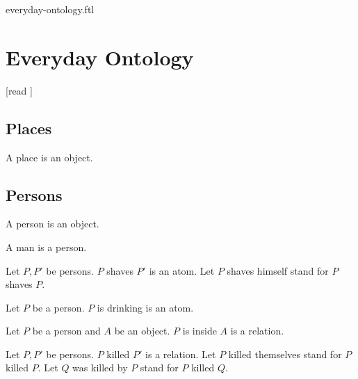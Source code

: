 \documentclass{article}
\begin{document}
\begin{smodule}{everyday-ontology.ftl}

\section{Everyday Ontology}

\begin{forthel}

  [read ]
\end{forthel}


\subsection{Places}

\begin{signature*}[forthel]
  A place is an object.
\end{signature*}


\subsection{Persons}

\begin{signature*}[forthel]
  A person is an object.
\end{signature*}

\begin{signature*}[forthel]
  A man is a person.
\end{signature*}

\begin{signature*}[forthel]
  Let $P, P'$ be persons.
  $P$ shaves $P'$ is an atom.
  Let $P$ shaves himself stand for $P$ shaves $P$.
\end{signature*}

\begin{signature*}[forthel]
  Let $P$ be a person.
  $P$ is drinking is an atom.
\end{signature*}

\begin{signature*}[forthel]
  Let $P$ be a person and $A$ be an object.
  $P$ is inside $A$ is a relation.
\end{signature*}

\begin{signature*}[forthel]
  Let $P, P'$ be persons.
  $P$ killed $P'$ is a relation.
  Let $P$ killed themselves stand for $P$ killed $P$.
  Let $Q$ was killed by $P$ stand for $P$ killed $Q$.
\end{signature*}


\end{smodule}
\end{document}
